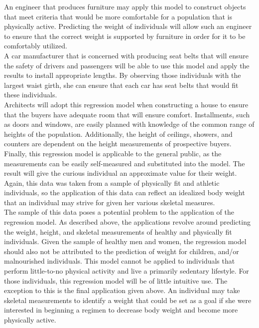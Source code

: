 \documentclass[11pt]{article}
\begin{document}
An engineer that produces furniture may apply this model to construct objects that meet criteria that would be more comfortable for a population that is physically active.  Predicting the weight of individuals will allow such an engineer to ensure that the correct weight is supported by furniture in order for it to be comfortably utilized.  \\

A car manufacturer that is concerned with producing seat belts that will ensure the safety of drivers and passengers will be able to use this model and apply the results to install appropriate lengths.  By observing those individuals with the largest waist girth, she can ensure that each car has seat belts that would fit these individuals.  \\

Architects will adopt this regression model when constructing a house to ensure that the buyers have adequate room that will ensure comfort.  Installments, such as doors and windows, are easily planned with knowledge of the common range of heights of the population.  Additionally, the height of ceilings, showers, and counters are dependent on the height measurements of prospective buyers.  
Finally, this regression model is applicable to the general public, as the measurements can be easily self-measured and substituted into the model.  The result will give the curious individual an approximate value for their weight.  Again, this data was taken from a sample of physically fit and athletic individuals, so the application of this data can reflect an idealized body weight that an individual may strive for given her various skeletal measures.  \\

The sample of this data poses a potential problem to the application of the regression model.  As described above, the applications revolve around predicting the weight, height, and skeletal measurements of healthy and physically fit individuals.  Given the sample of healthy men and women, the regression model should also not be attributed to the prediction of weight for children, and/or malnourished individuals.  This model cannot be applied to individuals that perform little-to-no physical activity and live a primarily sedentary lifestyle.  For those individuals, this regression model will be of little intuitive use.  The exception to this is the final application given above.  An individual may take skeletal measurements to identify a weight that could be set as a goal if she were interested in beginning a regimen to decrease body weight and become more physically active.\\
\end{document}
